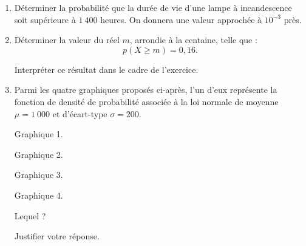 \begin{enumerate}
     \item
     Déterminer la probabilité que la durée de vie d'une lampe à incandescence soit supérieure à $1\ 400$ heures. On donnera une valeur approchée à $10^{-3}$ près.
     \item
     Déterminer la valeur du réel $m$, arrondie à la centaine, telle que :
     \[ p(X \geqslant m) = 0,16. \]
     \par
     Interpréter ce résultat dans le cadre de l'exercice.
     \item
     Parmi les quatre graphiques proposés ci-après, l'un d'eux représente la fonction de densité de probabilité associée à la loi normale de moyenne $\mu =1\ 000$ et d'écart-type $\sigma = 200$.
     \par

\begin{center}
\end{center}
     \begin{center}
          Graphique 1.
     \end{center}
     \par

\begin{center}
\end{center}
     \begin{center}
          Graphique 2.
     \end{center}
\par
\begin{center}
\end{center}
     \begin{center}
          Graphique 3.
     \end{center}
     \par
\begin{center}
\end{center}
     \begin{center}
          Graphique 4.
     \end{center}
     \par
     Lequel ?
     \par
     Justifier votre réponse.
     \par
\end{enumerate}
